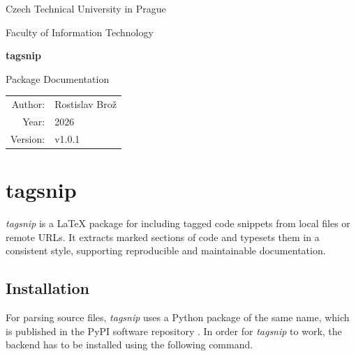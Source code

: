 \documentclass{article}
\begin{document}
\hypersetup{pageanchor=false}
\begin{titlepage}
    \centering

    {\Large Czech Technical University in Prague\par}
    {\Large Faculty of Information Technology\par}

    \vspace{3cm}

    {\Huge\bfseries tagsnip\par}

    \vspace{0.5cm}

    {\Large Package Documentation\par}

    \vfill

    \begin{tabular}{rl}
        Author: & Rostislav Brož \\
        Year: & 2026 \\
        Version: & v1.0.1 \\
    \end{tabular}

    \vspace{2cm}
\end{titlepage}

\hypersetup{pageanchor=true}
\clearpage
{}

\section*{tagsnip}

\textit{tagsnip} is a \LaTeX{} package for including tagged code snippets from local files or remote URLs. 
It extracts marked sections of code and typesets them in a consistent style, 
supporting reproducible and maintainable documentation.

\subsection*{Installation}

For parsing source files, \textit{tagsnip} uses a Python package of the same name, 
which is published in the PyPI software repository \citep{pypi}. 
In order for \textit{tagsnip} to work, 
the backend has to be installed using the following command.

\end{document}
